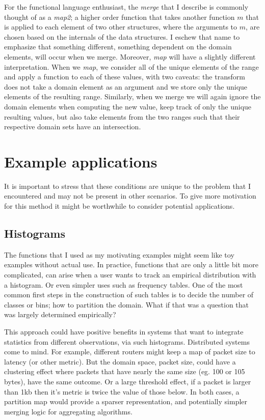 \documentclass{article}
\begin{document}
For the functional language enthusiast, the \emph{merge} that I
describe is commonly thought of as a \emph{map2}; a higher order function that
takes another function $m$ that is applied to each element of two other
structures,
where the arguments to $m$,
are chosen based on the internals of the data structures.
I eschew that name to emphasize that something different,
something dependent on the domain elements,
will occur when we merge.
Moreover, \emph{map} will have a slightly different interpretation.
When we \emph{map},
we consider all of the unique elements of the range and
apply a function to each of these values,
with two caveats: the transform does not take a domain element as an
argument and we store only the unique elements of the resulting range.
Similarly, when we merge we will again ignore the domain elements when computing
the new value,
keep track of only the unique resulting values,
but also take elements from the two ranges such that their respective domain sets
have an intersection.

\section{Example applications}

It is important to stress that these conditions are unique to the problem that
I encountered and may not be present in other scenarios.
To give more motivation for this method it might be worthwhile to consider
potential applications.

\subsection{Histograms}

The functions that I used as my motivating examples might seem like toy
examples without actual use.
In practice,
functions that are only a little bit more complicated,
can arise when a user wants to track an empirical distribution with a histogram.
Or even simpler uses such as frequency tables.
One of the most common first steps in the construction of such tables is to
decide the number of classes or bins;
how to partition the domain.
What if that was a question that was largely determined empirically?

This approach could have positive benefits in systems that want to integrate
statistics from different observations, via such histograms.
Distributed systems come to mind.
For example, different routers might keep a map of packet size to latency
(or other metric).
But the domain space,
packet size,
could have a clustering effect
where packets that have nearly the same size
(eg. 100 or 105 bytes),
have the same outcome.
Or a large threshold effect,
if a packet is larger than 1kb then it's metric is twice the value of
those below.
In both cases,
a partition map would provide a sparser representation,
and potentially simpler merging logic for aggregating algorithms.
\end{document}
